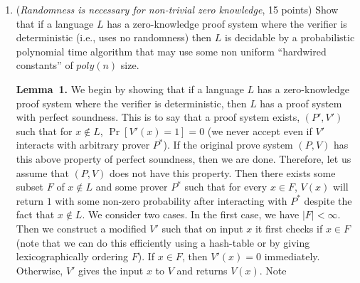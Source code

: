 \documentclass{article}
\begin{document}
\begin{enumerate}[,start=5]%

\item{}
(\emph{Randomness is necessary for non-trivial zero knowledge}, 15 points)
Show that if a language $L$ has a zero-knowledge proof system where the verifier is deterministic (i.e., uses no randomness) then $L$ is decidable by a  probabilistic polynomial time algorithm that may use some non uniform \textquotedblleft{}hardwired constants\textquotedblright{} of $poly(n)$ size.%

\begin{mdbmarginx}{1ex}{0pt}{1ex}{0pt}%
\noindent{}\textbf{Lemma~1.} \mdbr
{}We begin by showing that if a language $L$ has a zero-knowledge proof system where the verifier is deterministic,
then $L$ has a proof system with perfect soundness. This is to say that a proof system exists, $(P',V')$
such that for $x \notin L$, $\Pr[V'(x) = 1] = 0$ (we never accept even if $V'$ interacts with
arbitrary prover $P^*$). If the original prove system $(P,V)$ has this above property of perfect
soundness, then we are done. Therefore, let us assume that $(P,V)$ does not have this property.
Then there exists some subset $F$ of $x \notin L$ and some prover $P^*$ 
such that for every $x \in F$, $V(x)$ will return $1$ with some non-zero probability after
interacting with $P^*$ despite the fact that $x \notin L$. 
We consider two cases. In the first case, we have $|F| < \infty$. Then 
we construct a modified $V'$ such that on input $x$ it first checks if $x \in F$ (note that we 
can do this efficiently using a hash-table or by giving lexicographically ordering $F$). If $x \in F$,
then $V'(x) = 0$ immediately. Otherwise, $V'$ gives the input $x$ to $V$ and returns $V(x)$. Note

\end{mdbmarginx}
\end{enumerate}
\end{document}

